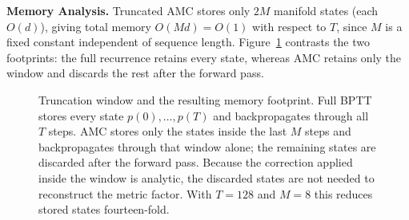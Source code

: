 \documentclass[a4paper,fleqn]{cas-dc}
\begin{document}
\textbf{Memory Analysis.} Truncated AMC stores only $2M$ manifold states (each $O(d)$), giving total memory $O(Md) = O(1)$ with respect to $T$, since $M$ is a fixed constant independent of sequence length. Figure~\ref{fig:trunc_window} contrasts the two footprints: the full recurrence retains every state, whereas AMC retains only the window and discards the rest after the forward pass.

\begin{figure}[pos=htbp]
\centering
{}
\caption{Truncation window and the resulting memory footprint. Full BPTT stores every state $p(0),\ldots,p(T)$ and backpropagates through all $T$ steps. AMC stores only the states inside the last $M$ steps and backpropagates through that window alone; the remaining states are discarded after the forward pass. Because the correction applied inside the window is analytic, the discarded states are not needed to reconstruct the metric factor. With $T{=}128$ and $M{=}8$ this reduces stored states fourteen-fold.}
\label{fig:trunc_window}
\end{figure}
\end{document}
